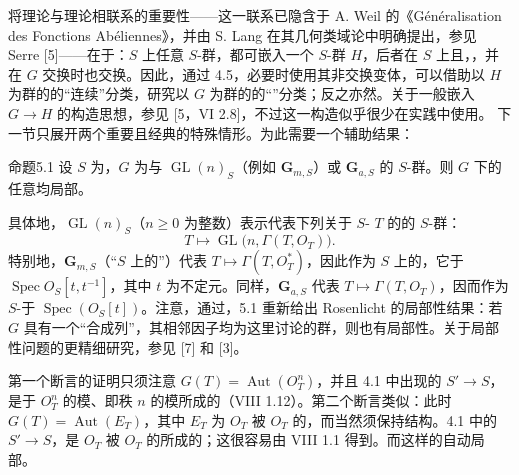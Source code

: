 将理论与理论相联系的重要性——这一联系已隐含于 A. Weil 的《Généralisation des Fonctions Abéliennes》，并由 S. Lang 在其几何类域论中明确提出，参见 Serre [5]——在于：$S$ 上任意 $S$-群，都可嵌入一个 $S$-群 $H$，后者在 $S$ 上且，，并在 $G$ 交换时也交换。因此，通过 4.5，必要时使用其非交换变体，可以借助以 $H$ 为群的的“连续”分类，研究以 $G$ 为群的的“”分类；反之亦然。关于一般嵌入 $G\to H$ 的构造思想，参见 [5，VI 2.8]，不过这一构造似乎很少在实践中使用。
下一节只展开两个重要且经典的特殊情形。为此需要一个辅助结果：

\begin{SGAresult}{命题}{5.1}
设 $S$ 为，$G$ 为与 $\operatorname{GL}(n)_S$（例如 $\mathbf G_{m,S}$）或 $\mathbf G_{a,S}$ 的 $S$-群。则 $G$ 下的任意均局部。
\end{SGAresult}
具体地，$\operatorname{GL}(n)_S$（$n\geq0$ 为整数）表示代表下列关于 $S$- $T$ 的的 $S$-群：
\[
T\longmapsto\operatorname{GL}\bigl(n,\Gamma(T,O_T)\bigr).
\]
特别地，$\mathbf G_{m,S}$（“$S$ 上的”）代表 $T\mapsto\Gamma(T,O_T^*)$，因此作为 $S$ 上的，它于 $\operatorname{Spec}O_S[t,t^{-1}]$，其中 $t$ 为不定元。同样，$\mathbf G_{a,S}$ 代表 $T\mapsto\Gamma(T,O_T)$，因而作为 $S$-于 $\operatorname{Spec}(O_S[t])$。注意，通过，5.1 重新给出 Rosenlicht 的局部性结果：若 $G$ 具有一个“合成列”，其相邻因子均为这里讨论的群，则也有局部性。关于局部性问题的更精细研究，参见 [7] 和 [3]。

第一个断言的证明只须注意 $G(T)=\operatorname{Aut}(O_T^n)$，并且 4.1 中出现的 $S'\to S$，是于 $O_T^n$ 的模、即秩 $n$ 的模所成的（VIII 1.12）。第二个断言类似：此时 $G(T)=\operatorname{Aut}(E_T)$，其中 $E_T$ 为 $O_T$ 被 $O_T$ 的，而当然须保持结构。4.1 中的 $S'\to S$，是 $O_T$ 被 $O_T$ 的所成的；这很容易由 VIII 1.1 得到。而这样的自动局部。

